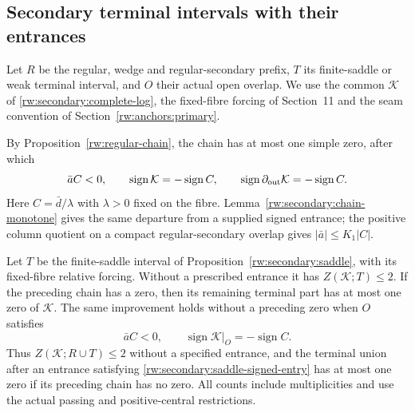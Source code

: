\subsection{Secondary terminal intervals with their entrances}
\label{rw:anchors:secondary}

Let $R$ be the regular, wedge and regular-secondary prefix, $T$ its
finite-saddle or weak terminal interval, and $O$ their actual open
overlap. We use the common $\mathcal K$ of
\eqref{rw:secondary:complete-log}, the fixed-fibre forcing of
Section~11 and the seam convention of Section~\ref{rw:anchors:primary}.

By Proposition~\ref{rw:regular-chain}, the chain has at most one
simple zero, after which
\begin{equation}\label{rw:secondary:anchor-entry}
 \bar aC<0,\qquad
 \operatorname{sign}\mathcal K=-\operatorname{sign}C,\qquad
 \operatorname{sign}\partial_{\rm out}\mathcal K
                                      =-\operatorname{sign}C .
\end{equation}
Here $C=\bar d/\lambda$ with $\lambda>0$ fixed on the fibre.
Lemma~\ref{rw:secondary:chain-monotone} gives the same departure
from a supplied signed entrance; the positive column quotient on a
compact regular-secondary overlap gives $|\bar a|\le K_1|C|$.

\begin{proposition}
\label{rw:secondary:saddle-anchor}
Let $T$ be the finite-saddle interval of
Proposition~\ref{rw:secondary:saddle}, with its fixed-fibre relative
forcing. Without a prescribed entrance it has
$Z(\mathcal K;T)\le2$.
If the preceding chain has a zero, then its remaining terminal part
has at most one zero of $\mathcal K$. The same improvement holds
without a preceding zero when $O$ satisfies
\begin{equation}\label{rw:secondary:saddle-signed-entry}
 \bar aC<0,\qquad
 \operatorname{sign}\mathcal K|_O=-\operatorname{sign}C .
\end{equation}
Thus $Z(\mathcal K;R\cup T)\le2$ without a specified entrance,
and the terminal union after an entrance satisfying
\eqref{rw:secondary:saddle-signed-entry} has at most one zero
if its preceding chain has no zero.
All counts include multiplicities and use the actual passing and
positive-central restrictions.
\end{proposition}


